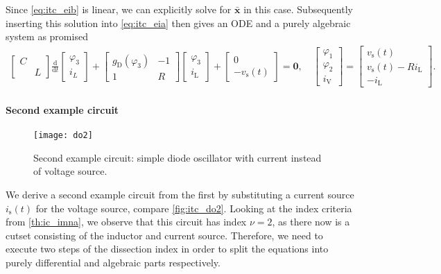 \documentclass[AMA,STIX1COL]{WileyNJD-v2}
\newcommand{\mb}[1]{\mathbf{#1}}
\newcommand{\mbb}[1]{\bar{\mathbf{#1}}}
\newcommand{\mr}[1]{\mathrm{#1}}
\newcommand{\ddt}{\frac{\mathrm{d}}{\mathrm{d}t}}
\begin{document}
Since \eqref{eq:itc_eib} is linear, we can explicitly solve for $\mbb{x}$ in this case. Subsequently inserting this solution into \eqref{eq:itc_eia} then gives an ODE and a purely algebraic system as promised
\begin{align}
    \begin{bmatrix}
        C &\\
        & L
    \end{bmatrix} \ddt \begin{bmatrix}
        \varphi_3\\
        i_L
    \end{bmatrix} + \begin{bmatrix}
        g_\mr{D}(\varphi_3) & -1\\
        1 & R
    \end{bmatrix} \begin{bmatrix}
        \varphi_3\\
        i_\mr{L}
    \end{bmatrix} + \begin{bmatrix}
        0\\
        -v_\mr{s}(t)
    \end{bmatrix} = \mb{0}, \quad \begin{bmatrix}
        \varphi_1\\
        \varphi_2\\
        i_\mr{V}
    \end{bmatrix} = \begin{bmatrix}
        v_\mr{s}(t)\\
        v_\mr{s}(t) - R i_\mr{L}\\
        -i_\mr{L}
    \end{bmatrix}. \label{eq:itc_do1}
\end{align}

\paragraph{Second example circuit}
\begin{figure}[b]
    \begin{center}
        \texttt{[image: do2]}
    \end{center}
    \caption{Second example circuit: simple diode oscillator with current instead of voltage source.}
    \label{fig:itc_do2}
\end{figure}
We derive a second example circuit from the first by substituting a current source $i_\mr{s}(t)$ for the voltage source, compare \autoref{fig:itc_do2}. Looking at the index criteria from \autoref{th:ic_imna}, we observe that this circuit has index $\nu = 2$, as there now is a cutset consisting of the inductor and current source. Therefore, we need to execute two steps of the dissection index in order to split the equations into purely differential and algebraic parts respectively.
\end{document}
